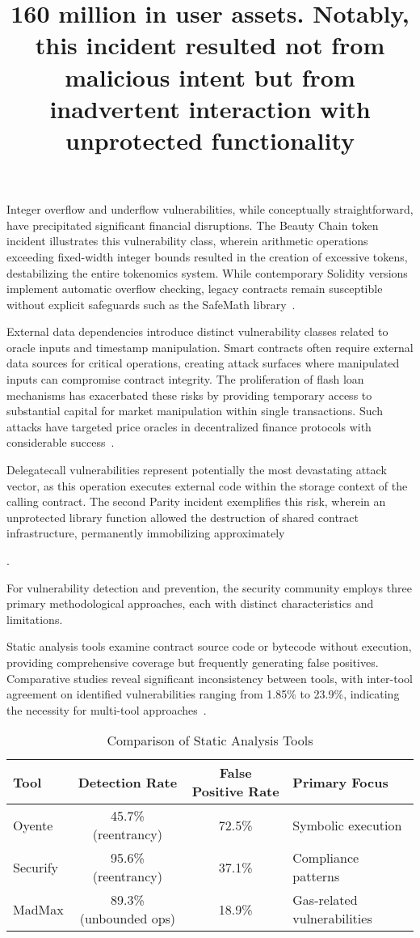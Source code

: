 Integer overflow and underflow vulnerabilities, while conceptually straightforward, have precipitated significant financial disruptions. The Beauty Chain token incident illustrates this vulnerability class, wherein arithmetic operations exceeding fixed-width integer bounds resulted in the creation of excessive tokens, destabilizing the entire tokenomics system. While contemporary Solidity versions implement automatic overflow checking, legacy contracts remain susceptible without explicit safeguards such as the SafeMath library~\cite{praitheeshan2019systematic, perez2020analysis}.

External data dependencies introduce distinct vulnerability classes related to oracle inputs and timestamp manipulation. Smart contracts often require external data sources for critical operations, creating attack surfaces where manipulated inputs can compromise contract integrity. The proliferation of flash loan mechanisms has exacerbated these risks by providing temporary access to substantial capital for market manipulation within single transactions. Such attacks have targeted price oracles in decentralized finance protocols with considerable success~\cite{perez2021analysis, praitheeshan2019systematic}.

Delegatecall vulnerabilities represent potentially the most devastating attack vector, as this operation executes external code within the storage context of the calling contract. The second Parity incident exemplifies this risk, wherein an unprotected library function allowed the destruction of shared contract infrastructure, permanently immobilizing approximately \title{160 million in user assets. Notably, this incident resulted not from malicious intent but from inadvertent interaction with unprotected functionality}\cite{praitheeshan2019systematic}.

For vulnerability detection and prevention, the security community employs three primary methodological approaches, each with distinct characteristics and limitations.

Static analysis tools examine contract source code or bytecode without execution, providing comprehensive coverage but frequently generating false positives. Comparative studies reveal significant inconsistency between tools, with inter-tool agreement on identified vulnerabilities ranging from 1.85\% to 23.9\%, indicating the necessity for multi-tool approaches~\cite{perez2021analysis, perez2020analysis}.
\begin{table}[h]
\centering
\caption{Comparison of Static Analysis Tools}
\begin{tabular}{|l|c|c|l|}
\hline
\textbf{Tool} & \textbf{Detection Rate} & \textbf{False Positive Rate} & \textbf{Primary Focus} \\
\hline
Oyente & 45.7\% (reentrancy) & 72.5\% & Symbolic execution \\
Securify & 95.6\% (reentrancy) & 37.1\% & Compliance patterns \\
MadMax & 89.3\% (unbounded ops) & 18.9\% & Gas-related vulnerabilities \\
\hline
\end{tabular}
\end{table}

